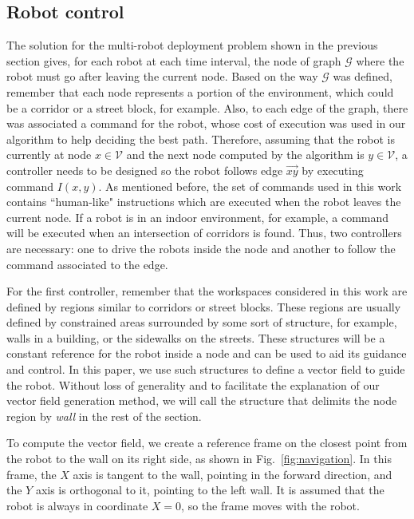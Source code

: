 \documentclass[smallcondensed]{svjour3}
\begin{document}
\subsection{Robot control}
\label{sec:robotcontrol}

The solution for the multi-robot deployment problem shown in the previous section gives, for each robot at each time interval, the node of graph $\mathcal{G}$ where the robot must go after leaving the current node. Based on the way $\mathcal{G}$ was defined, remember that each node represents a portion of the environment, which could be a corridor or a street block, for example. Also, to each edge of the graph, there was associated a command for the robot, whose cost of execution was used in our algorithm to help deciding the best path.  Therefore, assuming that the robot is currently at node $x\in\mathcal{V}$ and the next node computed by the algorithm is $y\in\mathcal{V}$, a controller needs to be designed so the robot follows edge $\overrightarrow{xy}$ by executing command $I(x,y)$. As mentioned before, the set of commands used in this work contains ``human-like" instructions which are executed when the robot leaves the current node. If a robot is in an indoor environment, for example, a command will be executed when an intersection of corridors is found. Thus, two controllers are necessary: one to drive the robots inside the node and another to follow the command associated to the edge. 

For the first controller, remember that the workspaces considered in this work are defined by regions similar to corridors or street blocks. These regions are usually defined by constrained areas surrounded by some sort of structure, for example, walls in a building, or the sidewalks on the streets. These structures will be a constant reference for the robot inside a node and can be used to aid its guidance and control. In this paper, we use such structures to define a vector field to guide the robot. Without loss of generality and to facilitate the explanation of our vector field generation method, we will call the structure that delimits the node region by \emph{wall} in the rest of the section.

To compute the vector field, we create a reference frame on the closest point from the robot to the wall on its right side, as shown in Fig.~\ref{fig:navigation}. In this frame, the $X$ axis is tangent to the wall, pointing in the forward direction, and the $Y$ axis is orthogonal to it, pointing to the left wall. It is assumed that the robot is always in coordinate $X=0$, so the frame moves with the robot.
\end{document}
